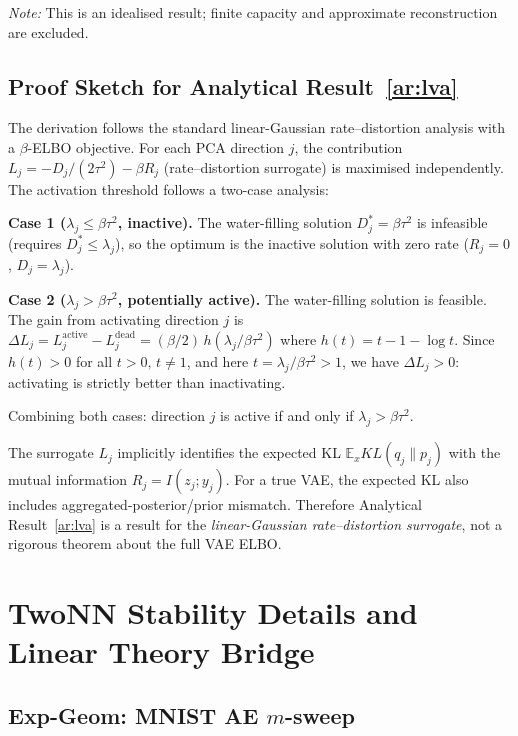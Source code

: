 \documentclass[make,article,submit,pdftex,moreauthors]{Definitions/mdpi}
\begin{document}
\noindent
\textit{Note:} This is an idealised result; finite capacity and approximate
reconstruction are excluded.

\subsection{Proof Sketch for Analytical Result~\ref{ar:lva}}\label{app:linear_vae_proof}

The derivation follows the standard linear-Gaussian rate--distortion analysis
with a $\beta$-ELBO objective.  For each PCA direction $j$, the contribution
$L_j = -D_j/(2\tau^2) - \beta R_j$ (rate--distortion surrogate) is maximised
independently.  The activation threshold follows a two-case analysis:

\textbf{Case 1 ($\lambda_j \leq \beta\tau^2$, inactive).}
The water-filling solution $D_j^*=\beta\tau^2$ is infeasible
(requires $D_j^* \leq \lambda_j$), so the optimum is the inactive solution
with zero rate ($R_j=0$, $D_j=\lambda_j$).

\textbf{Case 2 ($\lambda_j > \beta\tau^2$, potentially active).}
The water-filling solution is feasible.
The gain from activating direction $j$ is
$\Delta L_j = L_j^{\mathrm{active}}-L_j^{\mathrm{dead}}
= (\beta/2)\,h(\lambda_j/\beta\tau^2)$
where $h(t)=t-1-\log t$.  Since $h(t)>0$ for all $t>0,\,t\neq1$, and here
$t=\lambda_j/\beta\tau^2>1$, we have $\Delta L_j>0$: activating is strictly
better than inactivating.

Combining both cases: direction $j$ is active if and only if $\lambda_j>\beta\tau^2$.

\begin{remark}
The surrogate $L_j$ implicitly identifies the expected KL $\mathbb{E}_xKL(q_j\|p_j)$
with the mutual information $R_j=I(z_j;y_j)$.
For a true VAE, the expected KL also includes aggregated-posterior/prior mismatch.
Therefore Analytical Result~\ref{ar:lva} is a result for the \emph{linear-Gaussian
rate--distortion surrogate}, not a rigorous theorem about the full VAE ELBO.
\end{remark}

\section{TwoNN Stability Details and Linear Theory Bridge}
\label{app:twonn_detail}

\subsection{Exp-Geom: MNIST AE $m$-sweep}
\end{document}

